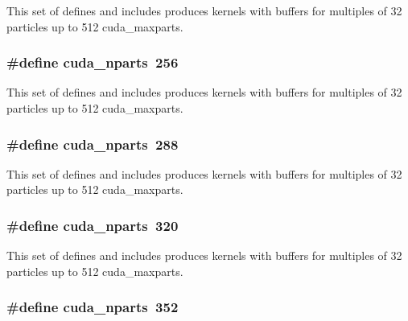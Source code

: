 This set of defines and includes produces kernels with buffers for multiples of 32 particles up to 512 cuda\-\_\-maxparts. \hypertarget{runner__cuda_8cu_a73a9582f0db5b61423deb6c2e5ade9e8}{
\subsubsection[{cuda\-\_\-nparts}]{\setlength{\rightskip}{0pt plus 5cm}\#define cuda\-\_\-nparts~256}}\label{runner__cuda_8cu_a73a9582f0db5b61423deb6c2e5ade9e8}
This set of defines and includes produces kernels with buffers for multiples of 32 particles up to 512 cuda\-\_\-maxparts. \hypertarget{runner__cuda_8cu_a73a9582f0db5b61423deb6c2e5ade9e8}{
\subsubsection[{cuda\-\_\-nparts}]{\setlength{\rightskip}{0pt plus 5cm}\#define cuda\-\_\-nparts~288}}\label{runner__cuda_8cu_a73a9582f0db5b61423deb6c2e5ade9e8}
This set of defines and includes produces kernels with buffers for multiples of 32 particles up to 512 cuda\-\_\-maxparts. \hypertarget{runner__cuda_8cu_a73a9582f0db5b61423deb6c2e5ade9e8}{
\subsubsection[{cuda\-\_\-nparts}]{\setlength{\rightskip}{0pt plus 5cm}\#define cuda\-\_\-nparts~320}}\label{runner__cuda_8cu_a73a9582f0db5b61423deb6c2e5ade9e8}
This set of defines and includes produces kernels with buffers for multiples of 32 particles up to 512 cuda\-\_\-maxparts. \hypertarget{runner__cuda_8cu_a73a9582f0db5b61423deb6c2e5ade9e8}{
\subsubsection[{cuda\-\_\-nparts}]{\setlength{\rightskip}{0pt plus 5cm}\#define cuda\-\_\-nparts~352}}\label{runner__cuda_8cu_a73a9582f0db5b61423deb6c2e5ade9e8}
